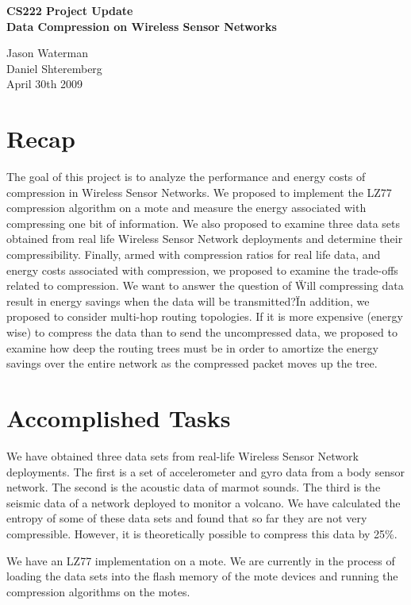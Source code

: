 \documentclass[10pt]{article}
\begin{document}
\begin{center}
\Large\textbf{CS222 Project Update \\ Data Compression on Wireless Sensor Networks}

\bigskip

Jason Waterman \\ Daniel Shteremberg \\
\medskip
April 30th 2009
\end{center}

\section{Recap}

The goal of this project is to analyze the performance and energy
costs of compression in Wireless Sensor Networks. We proposed to
implement the LZ77 compression algorithm on a mote and measure the energy
associated with compressing one bit of information. We also proposed
to examine three data sets obtained from real life Wireless Sensor
Network deployments and determine their compressibility. Finally,
armed with compression ratios for real life data, and energy costs
associated with compression, we proposed to examine the trade-offs
related to compression. We want to answer the question of \"Will
compressing data result in energy savings when the data will be
transmitted?\" In addition, we proposed to consider multi-hop routing
topologies. If it is more expensive (energy wise) to compress the
data than to send the uncompressed data, we proposed to examine how
deep the routing trees must be in order to amortize the energy savings
over the entire network as the compressed packet moves up the tree. 

\section{Accomplished Tasks}

We have obtained three data sets from real-life Wireless Sensor
Network deployments. The first is a set of accelerometer and gyro data
from a body sensor network. The second is the acoustic data of marmot
sounds. The third is the seismic data of a network deployed to monitor
a volcano. We have calculated the entropy of some of these data sets
and found that so far they are not very compressible. However, it is
theoretically possible to compress this data by 25\%. 

We have an LZ77 implementation on a mote. We are currently in the
process of loading the data sets into the flash memory of the mote
devices and running the compression algorithms on the motes. 
\end{document}
